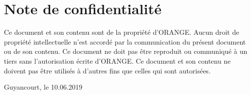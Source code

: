 \clearpage
\section*{Note de confidentialité}
\label{sec:SOOA}

\vspace{1cm}
Ce document et son contenu sont de la propriété d’ORANGE. Aucun droit de propriété intellectuelle n’est accordé par la communication du présent document ou de son contenu. Ce document ne doit pas être reproduit ou communiqué à un tiers sans l’autorisation écrite d’ORANGE. Ce document et son contenu ne doivent pas être utilisés à d’autres fins que celles qui sont autorisées.
\vspace{1cm}

\textbf{\thesisauthor{}} 

\vspace{0.5cm}
\noindent
Guyancourt, le 10.06.2019
